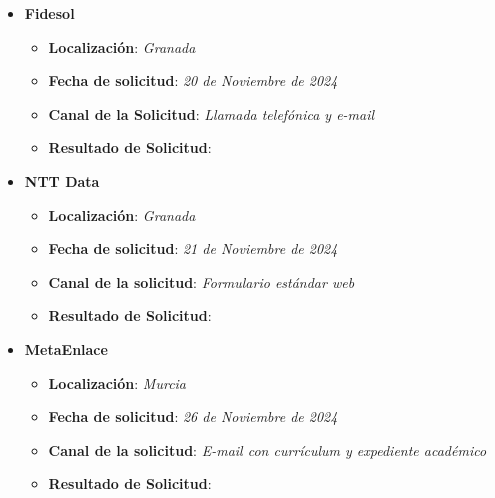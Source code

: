 \begin{itemize}
	\item {\large \textbf{Fidesol}}
	\begin{itemize}
		\item \textbf{Localización}: \textit{Granada}
		\item \textbf{Fecha de solicitud}: \textit{20 de Noviembre de 2024}
		\item \textbf{Canal de la Solicitud}: \textit{Llamada telefónica y e-mail}
		\item \textbf{Resultado de Solicitud}: 
	\end{itemize}
	\item {\large\textbf{NTT Data}}
		\begin{itemize}
		\item \textbf{Localización}: \textit{Granada}
		\item \textbf{Fecha de solicitud}: \textit{21 de Noviembre de 2024}
		\item \textbf{Canal de la solicitud}: \textit{Formulario estándar web}
		\item \textbf{Resultado de Solicitud}: 
	\end{itemize}
		\item {\large\textbf{MetaEnlace}}
	\begin{itemize}
		\item \textbf{Localización}: \textit{Murcia}
		\item \textbf{Fecha de solicitud}: \textit{26 de Noviembre de 2024}
		\item \textbf{Canal de la solicitud}: \textit{E-mail con currículum y expediente académico}
		\item \textbf{Resultado de Solicitud}: 
	\end{itemize}
	
\end{itemize}







%

